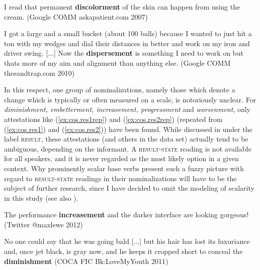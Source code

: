 \begin{exe}
  \ex \label{ex:cos-rs?}  
  \begin{xlist} 
    \item I read that permanent \textbf{discolorment} of the skin can happen from using the cream. {\small(Google COMM askapatient.com 2007)}
    \item I got a large and a small bucket (about 100 balls) because I wanted to just hit a ton with my wedges and dial their distances in better and work on my iron and driver swing. [...] Now the \textbf{dispersement} is something I need to work on but thats more of my aim and alignment than anything else. {\small(Google  COMM thesandtrap.com 2010)}
  \end{xlist}
\end{exe}

\begin{sloppypar}
\noindent In this respect, one group of nominalizations, namely those which denote a change which is typically or often measured on a scale, is notoriously unclear. For \textit{diminishment, embetterment, increasement, progressment} and \textit{worsenment}, only attestations like (\ref{ex:cos.res1rep}) and (\ref{ex:cos.res2rep}) (repeated from (\ref{ex:cos.res1}) and (\ref{ex:cos.res2})) have been found. 
While discussed in  under the label \textsc{result}, these attestations (and others in the data set) actually tend to be ambiguous, depending on the informant. A \textsc{result-state} reading is not available for all speakers, and it is never regarded as the most likely option in a given context. Why prominently scalar base verbs present such a fuzzy picture with regard to \textsc{result-state} readings in their nominalizations will have to be the subject of further research, since I have decided to omit the modeling of scalarity in this study (see also ).
\end{sloppypar}

\begin{exe}
  \ex 
  \begin{xlist}
  \item \label{ex:cos.res1rep} The performance \textbf{increasement} and the darker interface are looking gorgeous! 
  {\small(Twitter @maxlewe 2012)}
  \item \label{ex:cos.res2rep} No one could say that he was going bald [...] but his hair has lost its luxuriance and, once jet black, is gray now, and he keeps it cropped short to conceal the \textbf{diminishment} {\small(\acs{COCA} FIC Bk:LoveMyYouth 2011)}
  \end{xlist}
\end{exe}

